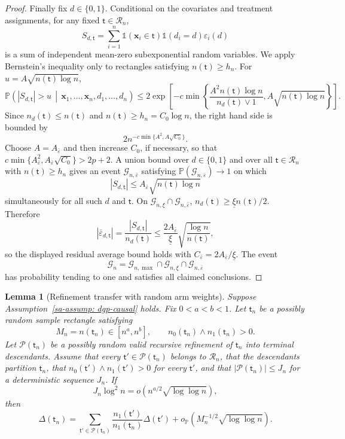 \documentclass[10pt]{article}
\def\nodet{\mathsf{t}}
\def\bx{\mathbf{x}}
\def\P{\mathbb{P}}
\newcommand{\Indicator}{\mathds{1}}
\newtheorem{lemma}[theorem]{Lemma}
\theoremstyle{definition}
\theoremstyle{remark}
\begin{document}
\begin{proof}
Finally fix $d\in\{0,1\}$. Conditional on the covariates and treatment
assignments, for any fixed $\nodet\in\mathcal R_n$,
\[
    S_{d,\nodet}
    =
    \sum_{i=1}^n
    \Indicator(\bx_i\in\nodet)\Indicator(d_i=d)\varepsilon_i(d)
\]
is a sum of independent mean-zero subexponential random variables. We apply Bernstein's inequality only to rectangles satisfying $n(\nodet)\geq h_n$. For $u=A\sqrt{n(\nodet)\log n}$,
\[
    \P\left(
        |S_{d,\nodet}|>u
        \,\middle|\,
        \bx_1,\ldots,\bx_n,d_1,\ldots,d_n
    \right)
    \leq
    2\exp\left[
        -c\min\left\{
            \frac{A^2 n(\nodet)\log n}{n_d(\nodet)\vee1},
            A\sqrt{n(\nodet)\log n}
        \right\}
    \right].
\]
Since $n_d(\nodet)\leq n(\nodet)$ and $n(\nodet)\geq h_n=C_0\log n$, the right
hand side is bounded by
\[
    2n^{-c\min\{A^2,A\sqrt{C_0}\}}.
\]
Choose $A=A_{\bar\varepsilon}$ and then increase $C_0$, if necessary, so that
$c\min\{A_{\bar\varepsilon}^2,A_{\bar\varepsilon}\sqrt{C_0}\}>2p+2$. A union
bound over $d\in\{0,1\}$ and over all $\nodet\in\mathcal R_n$ with
$n(\nodet)\geq h_n$ gives an event $\mathcal G_{n,\bar\varepsilon}$ satisfying
$\P(\mathcal G_{n,\bar\varepsilon})\to1$ on which
\[
    |S_{d,\nodet}|
    \leq
    A_{\bar\varepsilon}\sqrt{n(\nodet)\log n}
\]
simultaneously for all such $d$ and $\nodet$. On
$\mathcal G_{n,\xi}\cap\mathcal G_{n,\bar\varepsilon}$,
$n_d(\nodet)\geq \underline\xi n(\nodet)/2$. Therefore
\[
    |\bar\varepsilon_{d,\nodet}|
    =
    \frac{|S_{d,\nodet}|}{n_d(\nodet)}
    \leq
    \frac{2A_{\bar\varepsilon}}{\underline\xi}
    \sqrt{\frac{\log n}{n(\nodet)}} ,
\]
so the displayed residual average bound holds with
$C_{\bar\varepsilon}=2A_{\bar\varepsilon}/\underline\xi$. The event
\[
    \mathcal G_n
    =
    \mathcal G_{n,\max}\cap\mathcal G_{n,\xi}\cap
    \mathcal G_{n,\bar\varepsilon}
\]
has probability tending to one and satisfies all claimed conclusions.
\end{proof}

\begin{lemma}[Refinement transfer with random arm weights]\label{sa-lem:refinement-transfer-causal}
Suppose Assumption~\ref{sa-assump: dgp-causal} holds. Fix $0<a<b<1$. Let $\nodet_n$ be a possibly random sample rectangle satisfying
\[
    M_n=n(\nodet_n)\in[n^a,n^b],
    \qquad
    n_0(\nodet_n)\wedge n_1(\nodet_n)>0.
\]
Let $\mathcal P(\nodet_n)$ be a possibly random valid recursive refinement of $\nodet_n$ into terminal descendants. Assume that every $\nodet'\in\mathcal P(\nodet_n)$ belongs to $\mathcal R_n$, that the descendants partition $\nodet_n$, that $n_0(\nodet')\wedge n_1(\nodet')>0$ for every $\nodet'$, and that $|\mathcal P(\nodet_n)|\leq J_n$ for a deterministic sequence $J_n$. If
\[
    J_n\log^2 n
    =
    o\!\left(n^{a/2}\sqrt{\log\log n}\right),
\]
then
\[
    \Delta(\nodet_n)
    =
    \sum_{\nodet'\in\mathcal P(\nodet_n)}
    \frac{n_1(\nodet')}{n_1(\nodet_n)}
    \Delta(\nodet')
    +
    o_\P\!\left(M_n^{-1/2}\sqrt{\log\log n}\right).
\]
\end{lemma}
\end{document}
